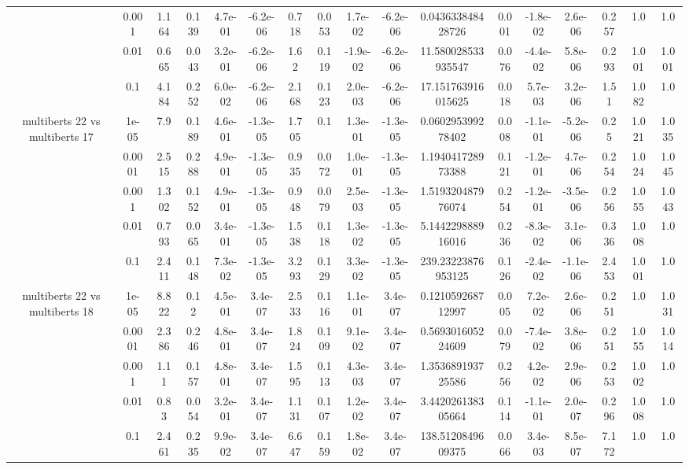 \begin{tabular}{|c|c|c|c|c|c|c|c|c|c|c|c|c|c|c|c|c|}
 & 0.001 & 1.164 & 0.139 & 4.7e-01 & -6.2e-06 & 0.718 & 0.053 & 1.7e-02 & -6.2e-06 & 0.043633848428726 & 0.001 & -1.8e-02 & 2.6e-06 & 0.257 & 1.0 & 1.0 \\
 & 0.01 & 0.665 & 0.043 & 3.2e-01 & -6.2e-06 & 1.62 & 0.119 & -1.9e-02 & -6.2e-06 & 11.580028533935547 & 0.076 & -4.4e-02 & 5.8e-06 & 0.293 & 1.001 & 1.001 \\
 & 0.1 & 4.184 & 0.252 & 6.0e-02 & -6.2e-06 & 2.168 & 0.123 & 2.0e-03 & -6.2e-06 & 17.151763916015625 & 0.018 & 5.7e-03 & 3.2e-06 & 1.51 & 1.082 & 1.0 \\
\hline
\multirow{5}{*}{multiberts 22 vs multiberts 17} & 1e-05 & 7.9 & 0.189 & 4.6e-01 & -1.3e-05 & 1.705 & 0.1 & 1.3e-01 & -1.3e-05 & 0.060295399278402 & 0.008 & -1.1e-01 & -5.2e-06 & 0.25 & 1.021 & 1.035 \\
 & 0.0001 & 2.515 & 0.288 & 4.9e-01 & -1.3e-05 & 0.935 & 0.072 & 1.0e-01 & -1.3e-05 & 1.194041728973388 & 0.121 & -1.2e-01 & 4.7e-06 & 0.254 & 1.024 & 1.045 \\
 & 0.001 & 1.302 & 0.152 & 4.9e-01 & -1.3e-05 & 0.948 & 0.079 & 2.5e-03 & -1.3e-05 & 1.519320487976074 & 0.254 & -1.2e-01 & -3.5e-06 & 0.256 & 1.055 & 1.043 \\
 & 0.01 & 0.793 & 0.065 & 3.4e-01 & -1.3e-05 & 1.538 & 0.118 & 1.3e-02 & -1.3e-05 & 5.144229888916016 & 0.236 & -8.3e-02 & 3.1e-06 & 0.336 & 1.008 & 1.0 \\
 & 0.1 & 2.411 & 0.148 & 7.3e-02 & -1.3e-05 & 3.293 & 0.129 & 3.3e-02 & -1.3e-05 & 239.23223876953125 & 0.126 & -2.4e-02 & -1.1e-06 & 2.453 & 1.001 & 1.0 \\
\hline
\multirow{5}{*}{multiberts 22 vs multiberts 18} & 1e-05 & 8.822 & 0.12 & 4.5e-01 & 3.4e-07 & 2.533 & 0.116 & 1.1e-01 & 3.4e-07 & 0.121059268712997 & 0.005 & 7.2e-02 & 2.6e-06 & 0.251 & 1.0 & 1.031 \\
 & 0.0001 & 2.386 & 0.246 & 4.8e-01 & 3.4e-07 & 1.824 & 0.109 & 9.1e-02 & 3.4e-07 & 0.569301605224609 & 0.079 & -7.4e-02 & 3.8e-06 & 0.251 & 1.055 & 1.014 \\
 & 0.001 & 1.11 & 0.157 & 4.8e-01 & 3.4e-07 & 1.595 & 0.113 & 4.3e-03 & 3.4e-07 & 1.353689193725586 & 0.256 & 4.2e-02 & 2.9e-06 & 0.253 & 1.002 & 1.0 \\
 & 0.01 & 0.83 & 0.054 & 3.2e-01 & 3.4e-07 & 1.131 & 0.107 & 1.2e-02 & 3.4e-07 & 3.442026138305664 & 0.114 & -1.1e-01 & 2.0e-07 & 0.296 & 1.008 & 1.0 \\
 & 0.1 & 2.461 & 0.235 & 9.9e-02 & 3.4e-07 & 6.647 & 0.159 & 1.8e-02 & 3.4e-07 & 138.5120849609375 & 0.066 & 3.4e-03 & 8.5e-07 & 7.172 & 1.0 & 1.0 \\

\end{tabular}
